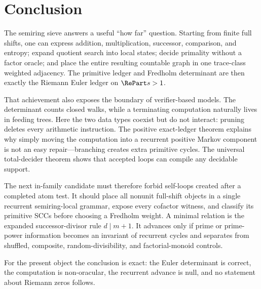 \section{Conclusion}
\label{sec:conclusion}

The semiring sieve answers a useful ``how far'' question.  Starting from
finite full shifts, one can express addition, multiplication, successor,
comparison, and entropy; expand quotient search into local states; decide
primality without a factor oracle; and place the entire resulting countable
graph in one trace-class weighted adjacency.  The primitive ledger and
Fredholm determinant are then exactly the Riemann Euler ledger on
$\RePart s>1$.

That achievement also exposes the boundary of verifier-based models.  The
determinant counts closed walks, while a terminating computation naturally
lives in feeding trees.  Here the two data types coexist but do not interact:
pruning deletes every arithmetic instruction.  The positive exact-ledger
theorem explains why simply moving the computation into a recurrent
positive Markov component is not an easy repair---branching creates extra
primitive cycles.  The universal total-decider theorem shows that accepted
loops can compile any decidable support.

The next in-family candidate must therefore forbid self-loops created after
a completed atom test.  It should place all nonunit full-shift objects in a
single recurrent semiring-local grammar, expose every cofactor witness, and
classify its primitive SCCs before choosing a Fredholm weight.  A minimal
relation is the expanded successor-divisor rule $d\mid m+1$.  It advances
only if prime or prime-power information becomes an invariant of recurrent
cycles and separates from shuffled, composite, random-divisibility, and
factorial-monoid controls.

For the present object the conclusion is exact: the Euler determinant is
correct, the computation is non-oracular, the recurrent advance is null, and
no statement about Riemann zeros follows.
